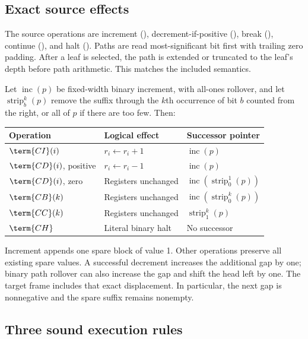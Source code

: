 \subsection{Exact source effects}

The source operations are increment (), decrement-if-positive
(), break (), continue (), and halt
(). Paths are read most-significant bit first with trailing
zero padding. After a leaf is selected, the path is extended or
truncated to the leaf's depth before path arithmetic. This matches
the included  semantics.

Let $\operatorname{inc}(p)$ be fixed-width binary increment, with
all-ones rollover, and let $\operatorname{strip}_b^k(p)$ remove the
suffix through the $k$th occurrence of bit $b$ counted from the right,
or all of $p$ if there are too few. Then:
\begin{center}
\begin{tabular}{@{}L{0.16\textwidth}L{0.32\textwidth}L{0.42\textwidth}@{}}
\toprule
Operation & Logical effect & Successor pointer\\
\midrule
$\term{CI}(i)$ & $r_i\gets r_i+1$ & $\operatorname{inc}(p)$\\
$\term{CD}(i)$, positive & $r_i\gets r_i-1$ & $\operatorname{inc}(p)$\\
$\term{CD}(i)$, zero & Registers unchanged &
$\operatorname{inc}(\operatorname{strip}_0^1(p))$\\
$\term{CB}(k)$ & Registers unchanged &
$\operatorname{inc}(\operatorname{strip}_0^k(p))$\\
$\term{CC}(k)$ & Registers unchanged &
$\operatorname{strip}_1^k(p)$\\
$\term{CH}$ & Literal binary halt & No successor\\
\bottomrule
\end{tabular}
\end{center}

Increment appends one spare block of value 1. Other operations
preserve all existing spare values. A successful decrement increases
the additional gap by one; binary path rollover can also increase
the gap and shift the head left by one. The target frame includes
that exact displacement. In particular, the next gap is nonnegative
and the spare suffix remains nonempty.

\subsection{Three sound execution rules}

